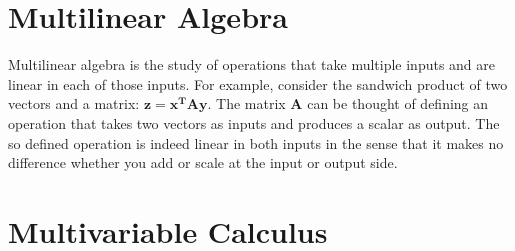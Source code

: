 \documentclass[12pt]{article}  %
\begin{document}
\section{Multilinear Algebra}
Multilinear algebra is the study of operations that take multiple inputs and are linear in each of those inputs. For example, consider the sandwich product of two vectors and a matrix: $\mathbf{z = x^T A y}$. The matrix $\mathbf{A}$ can be thought of defining an operation that takes two vectors as inputs and produces a scalar as output. The so defined operation is indeed linear in both inputs in the sense that it makes no difference whether you add or scale at the input or output side.

\section{Multivariable Calculus}
\end{document}
